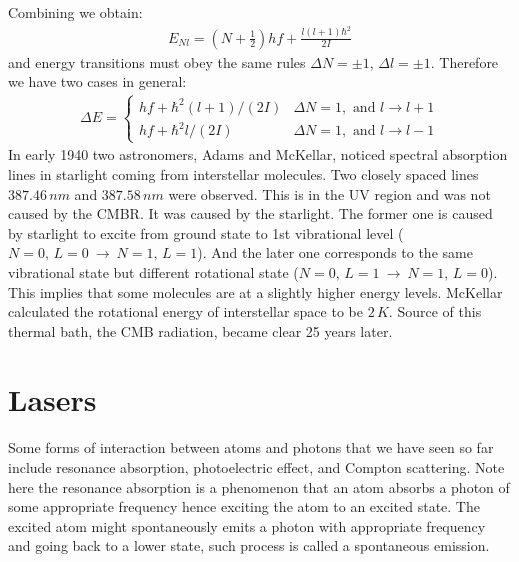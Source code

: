 \documentclass[11pt]{article}
\theoremstyle{break}
\theoremstyle{break}
\begin{document}
Combining we obtain:
\begin{align*}
E_{Nl} = \left( N + \frac{1}{2}\right) hf + \frac{l(l+1)\hbar^2}{2I}
\end{align*}
and energy transitions must obey the same rules $\Delta N = \pm 1$, $\Delta l = \pm 1$. Therefore we have two cases in general:
\begin{align*}
\Delta E = 
\begin{cases}
hf + \hbar^2(l+1)/(2I) & \Delta N = 1,\text{ and }l\to l+1 \\
hf + \hbar^2 l/(2I) & \Delta N = 1,\text{ and }l\to l-1
\end{cases}
\end{align*}
In early 1940 two astronomers, Adams and McKellar, noticed spectral absorption lines in starlight coming from interstellar molecules. Two closely spaced lines $387.46\, nm$ and $387.58 \,nm$ were observed. This is in the UV region and was not caused by the CMBR. It was caused by the starlight. The former one is caused by starlight to excite from ground state to 1st vibrational level ($N=0,\, L=0 \ \to\ N=1,\,L=1$). And the later one corresponds to the same vibrational state but different  rotational state ($N=0,\, L=1 \ \to\ N=1,\,L=0$). This implies that some molecules are at a slightly higher energy levels. McKellar calculated the rotational energy of interstellar space to be $2 \,K$. Source of this thermal bath, the CMB radiation, became clear 25 years later.\\

\newpage
\section[Lasers]{Lasers}
Some forms of interaction between atoms and photons that we have seen so far include resonance absorption, photoelectric effect, and Compton scattering. Note here the resonance absorption is a phenomenon that an atom absorbs a photon of some appropriate frequency hence exciting the atom to an excited state. The excited atom might  spontaneously emits a photon with appropriate frequency and going back to a lower state, such process is called a spontaneous emission.\\
\end{document}
